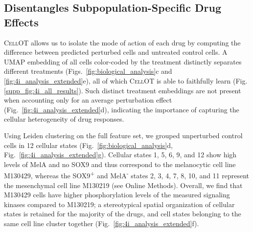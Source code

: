
\subsection{Disentangles Subpopulation-Specific Drug Effects}
\textsc{CellOT} allows us to 
isolate the mode of action of each drug by computing the difference between predicted perturbed cells and untreated control cells. %
A UMAP embedding of all cells color-coded by the treatment distinctly separates different treatments (Figs.~\ref{fig:biological_analysis}c and \ref{fig:4i_analysis_extended}e), all of which \textsc{CellOT} is able to faithfully learn (Fig. \ref{supp_fig:4i_all_results}).
Such distinct treatment embeddings are not present when accounting only for an average perturbation effect (Fig.~\ref{fig:4i_analysis_extended}d), indicating the importance of capturing the cellular heterogeneity of drug responses.

 Using Leiden clustering on the full feature set, we grouped unperturbed control cells in 12 cellular states (Fig.~\ref{fig:biological_analysis}d, Fig.~\ref{fig:4i_analysis_extended}g). Cellular states 1, 5, 6, 9, and 12 show high levels of MelA and no SOX9 and thus correspond to the melanocytic cell line M130429, whereas the SOX9\textsuperscript{+} and MelA\textsuperscript{-} states 2, 3, 4, 7, 8, 10, and 11 represent the mesenchymal cell line M130219 (see Online Methods). Overall, we find that M130429 cells have higher phosphorylation levels of the measured signaling kinases compared to M130219;
a stereotypical spatial organization of cellular states is retained for the majority of the drugs,  and cell states belonging to the same cell line cluster together (Fig.~\ref{fig:4i_analysis_extended}f). 


